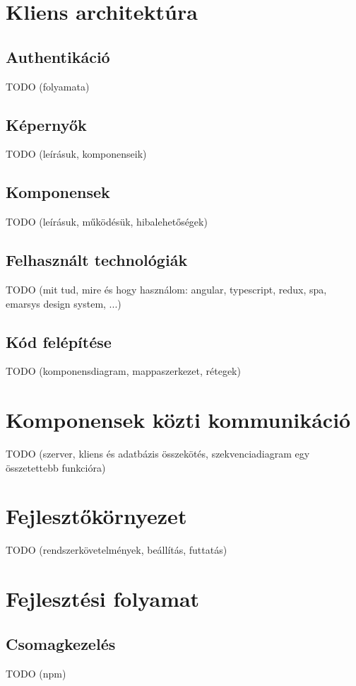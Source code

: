 \documentclass{elteikthesis}
\begin{document}
	\section{Kliens architektúra}
	\subsection{Authentikáció}
	TODO (folyamata)
	
	\subsection{Képernyők}
	TODO (leírásuk, komponenseik)
	
	\subsection{Komponensek}
	TODO (leírásuk, működésük, hibalehetőségek)
	
	\subsection{Felhasznált technológiák}
	TODO (mit tud, mire és hogy használom: angular, typescript, redux, spa, emarsys design system, ...)
	
	\subsection{Kód felépítése}
	TODO (komponensdiagram, mappaszerkezet, rétegek)
	
	\section{Komponensek közti kommunikáció}
	TODO (szerver, kliens és adatbázis összekötés, szekvenciadiagram egy összetettebb funkcióra)
	
	\section{Fejlesztőkörnyezet}
	TODO (rendszerkövetelmények, beállítás, futtatás)
	
	\section{Fejlesztési folyamat}
	\subsection{Csomagkezelés}
	TODO (npm)
	
\end{document}
